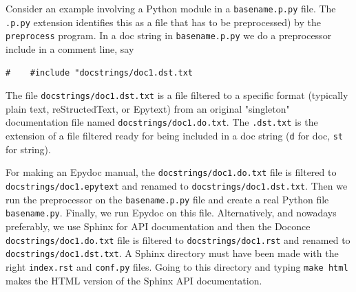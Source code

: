 \documentclass{article}
\begin{document}
\noindent
Consider an example involving a Python module in a {\fontsize{10pt}{10pt}\verb!basename.p.py!} file.
The {\fontsize{10pt}{10pt}\verb!.p.py!} extension identifies this as a file that has to be
preprocessed) by the {\fontsize{10pt}{10pt}\verb!preprocess!} program. 
In a doc string in {\fontsize{10pt}{10pt}\verb!basename.p.py!} we do a preprocessor include
in a comment line, say
\begin{Verbatim}[fontsize=\fontsize{9pt}{9pt},tabsize=8,baselinestretch=0.85,
fontfamily=tt,xleftmargin=7mm]
#    #include "docstrings/doc1.dst.txt
\end{Verbatim}
\noindent
% 
% 
The file {\fontsize{10pt}{10pt}\verb!docstrings/doc1.dst.txt!} is a file filtered to a specific format
(typically plain text, reStructedText, or Epytext) from an original
"singleton" documentation file named {\fontsize{10pt}{10pt}\verb!docstrings/doc1.do.txt!}. The {\fontsize{10pt}{10pt}\verb!.dst.txt!}
is the extension of a file filtered ready for being included in a doc
string ({\fontsize{10pt}{10pt}\verb!d!} for doc, {\fontsize{10pt}{10pt}\verb!st!} for string).

For making an Epydoc manual, the {\fontsize{10pt}{10pt}\verb!docstrings/doc1.do.txt!} file is
filtered to {\fontsize{10pt}{10pt}\verb!docstrings/doc1.epytext!} and renamed to
{\fontsize{10pt}{10pt}\verb!docstrings/doc1.dst.txt!}.  Then we run the preprocessor on the
{\fontsize{10pt}{10pt}\verb!basename.p.py!} file and create a real Python file
{\fontsize{10pt}{10pt}\verb!basename.py!}. Finally, we run Epydoc on this file. Alternatively, and
nowadays preferably, we use Sphinx for API documentation and then the
Doconce {\fontsize{10pt}{10pt}\verb!docstrings/doc1.do.txt!} file is filtered to
{\fontsize{10pt}{10pt}\verb!docstrings/doc1.rst!} and renamed to {\fontsize{10pt}{10pt}\verb!docstrings/doc1.dst.txt!}. A
Sphinx directory must have been made with the right {\fontsize{10pt}{10pt}\verb!index.rst!} and
{\fontsize{10pt}{10pt}\verb!conf.py!} files. Going to this directory and typing {\fontsize{10pt}{10pt}\verb!make html!} makes
the HTML version of the Sphinx API documentation.
\end{document}
